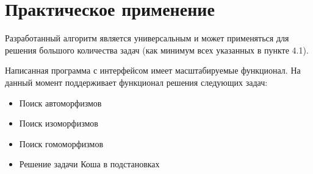 \section{Практическое применение}
\label{sec:AlgoPractice_6} 
\large

Разработанный алгоритм является универсальным и может применяться для решения большого количества задач (как минимум всех указанных в пункте 4.1).

Написанная программа с интерфейсом имеет масштабируемые функционал. На данный момент поддерживает функционал решения следующих задач:

\begin{itemize}
\item Поиск автоморфизмов
\item Поиск изоморфизмов
\item Поиск гомоморфизмов
\item Решение задачи Коша в подстановках
\end{itemize}